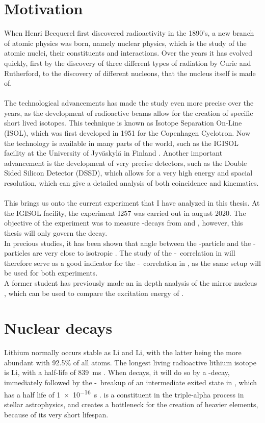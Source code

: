 \section{Motivation}
When Henri Becquerel first discovered radioactivity in the 1890's, a new branch of atomic physics was born, namely nuclear physics, which is the study of the atomic nuclei, their constituents and interactions. 
Over the years it has evolved quickly, first by the discovery of three different types of radiation by Curie and Rutherford, to the discovery of different nucleons, that the nucleus itself is made of. \\
\\
The technological advancements has made the study even more precise over the years, as the development of radioactive beams allow for the creation of specific short lived isotopes.
This technique is known as Isotope Separation On-Line (ISOL), which was first developed in 1951 for the Copenhagen Cyclotron. 
Now the technology is available in many parts of the world, such as the IGISOL facility at the University of Jyväskylä in Finland \cite{igisol}. 
Another important advancement is the development of very precise detectors, such as the Double Sided Silicon Detector (DSSD), which allows for a very high energy and spacial resolution, which can give a detailed analysis of both coincidence and kinematics. \\
\\
This brings us onto the current experiment that I have analyzed in this thesis. At the IGISOL facility, the experiment I257 was carried out in august 2020. The objective of the experiment was to measure \be-decays from \li and , however, this thesis will only govern the \li decay. \\
In precious studies, it has been shown that angle between the \be-particle and the \al-particles are very close to isotropic \cite{isotrop}. The study of the \be-\al\ correlation in \li will therefore serve as a good indicator for the \be-\al\ correlation in , as the same setup will be used for both experiments. \\
A former student has previously made an in depth analysis of the mirror nucleus , which can be used to compare the excitation energy of \ber \cite{andreas}. 


\section{Nuclear decays}
Lithium normally occurs stable as \isotope[6]Li and \isotope[7]Li, with the latter being the more abundant with 92.5\% of all atoms. The longest living radioactive lithium isotope is \isotope[8]Li, with a half-life of \SI{839}{ms} \cite{TILLEY2004155}. 
When \li decays, it will do so by a \be-decay, immediately followed by the \al-\al\ breakup of an intermediate exited state in \ber, which has a half life of \SI{1e-16}{s} \cite{TILLEY2004155}. \ber is a constituent in the triple-alpha process in stellar astrophysics, and creates a bottleneck for the creation of heavier elements, because of its very short lifespan.

